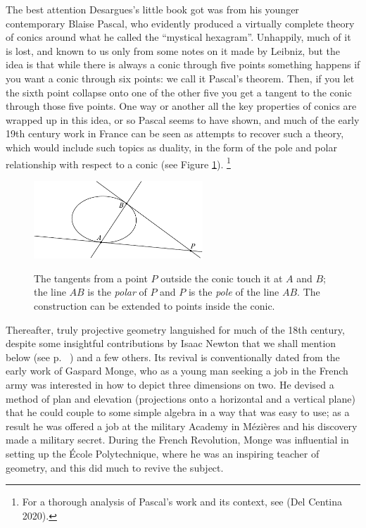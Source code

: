 The best attention Desargues's little book got was from his younger
contemporary Blaise Pascal,
%
 who evidently produced a virtually
complete theory of conics
%
around what he called the ``mystical hexagram''.
%
 Unhappily, much of it is lost, and known to us only from
some notes on it made by Leibniz,
%
but the idea is that while there is
always a conic through five points something happens if you want a conic
through six points: we call it Pascal's theorem.
%
 Then, if you let the
sixth point collapse onto one of the other five you get a tangent to the
conic through those five points. One way or another all the key properties
of conics are wrapped up in this idea, or so Pascal seems to have shown,
and much of the early 19th century work in France can be seen as attempts
to recover such a theory, which would include such topics as duality,
%
in the form of the pole and polar
%
%
relationship with respect to a conic
(see Figure \ref{figpolepolar}).%
%
\footnote{For a thorough analysis of
%
Pascal's work and its context, see (Del Centina 2020).}

\begin{figure}
\includegraphics[width=180pt]{main/poleandpolar}
\caption{The tangents from a point $P$ outside the conic touch it at
  $A$ and $B$; the line $AB$ is the \emph{polar} of $P$ and $P$ is the
  \emph{pole} of the line $AB$. The construction can be extended to
  points inside the conic.}
%
%
      \label{figpolepolar}
\end{figure}

Thereafter, truly projective geometry
%
languished for much of the 18th
century, despite some insightful contributions by Isaac Newton that we
shall mention below (see p. ~\pageref{Newtonconics}) and a few others. Its
revival is conventionally dated from the early work of Gaspard Monge,
%
who as a young man seeking a job in the French army was  interested in
how to depict three dimensions on two. He devised a method of plan and
elevation
%
(projections onto a horizontal and a vertical plane) that he
could couple to some simple algebra in a way that was easy to use; as a
result he was offered a job at the military Academy in M\'ezi\`eres
and
his discovery made a military secret. During the French Revolution, Monge
was influential in setting up the \'Ecole Polytechnique,
%
 where he was
an inspiring teacher of geometry, and this did much to revive the subject.

